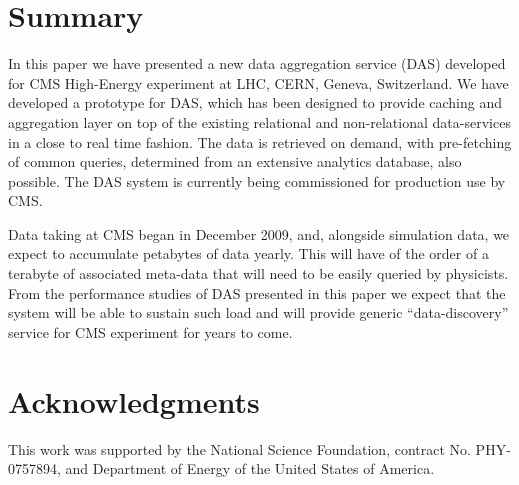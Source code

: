 \documentclass[1p,times]{elsarticle}
\begin{document}
\section{Summary}
In this paper we have presented a new data aggregation service (DAS) 
developed for CMS High-Energy experiment at LHC, CERN, Geneva, Switzerland. 
We have developed a prototype for DAS, which has been designed to provide 
caching and aggregation layer on top of the existing relational and 
non-relational data-services in a close to real time fashion. The data 
is retrieved on demand, with pre-fetching of common queries, 
determined from an extensive analytics database, also possible. 
The DAS system is currently being commissioned for production use by CMS. 

Data taking at CMS began in December 2009, and, alongside simulation 
data, we expect to accumulate petabytes of data yearly. This will have 
of the order of a terabyte of associated meta-data that will need to be 
easily queried by physicists. From the performance studies of DAS presented 
in this paper we expect that the system will be able to sustain such load 
and will provide generic “data-discovery” service for CMS experiment for 
years to come.

\section{Acknowledgments}

This work was supported by the National Science Foundation, 
contract No. PHY-0757894, and 
Department of Energy of the United States of America. 
\end{document}
